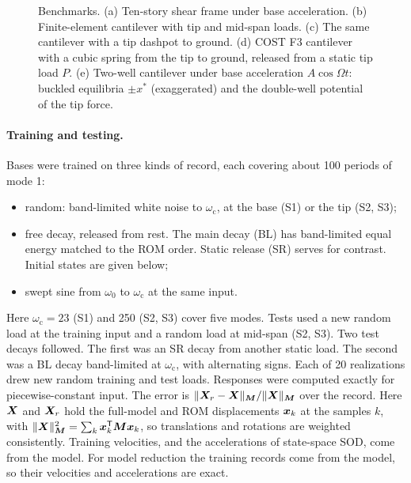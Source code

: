 \documentclass[preprint,12pt]{elsarticle}
\begin{document}
\begin{figure}[tbp]
\centering

\caption{Benchmarks. (a) Ten-story shear frame under base acceleration. (b) Finite-element cantilever with tip and mid-span loads. (c) The same cantilever with a tip dashpot to ground. (d) COST F3 cantilever with a cubic spring from the tip to ground, released from a static tip load $P$. (e) Two-well cantilever under base acceleration $A\cos\varOmega t$: buckled equilibria $\pm x^*$ (exaggerated) and the double-well potential of the tip force.}
\label{fig:systems}
\end{figure}

\paragraph{Training and testing.} Bases were trained on three kinds of record, each covering about 100 periods of mode 1:
\begin{itemize}
\item random: band-limited white noise to $\omega_{\mathrm c}$, at the base (S1) or the tip (S2, S3);
\item free decay, released from rest. The main decay (BL) has band-limited equal energy matched to the ROM order. Static release (SR) serves for contrast. Initial states are given below;
\item swept sine from $\omega_0$ to $\omega_{\mathrm c}$ at the same input.
\end{itemize}
Here $\omega_{\mathrm c}=23$ (S1) and 250 (S2, S3) cover five modes.
Tests used a new random load at the training input and a random load at mid-span (S2, S3). Two test decays followed. The first was an SR decay from another static load. The second was a BL decay band-limited at $\omega_{\mathrm c}$, with alternating signs.
Each of 20 realizations drew new random training and test loads.
Responses were computed exactly for piecewise-constant input.
The error is $\|\bm{X}_r-\bm{X}\|_{\bm{M}}/\|\bm{X}\|_{\bm{M}}$ over the record. Here $\bm{X}$ and $\bm{X}_r$ hold the full-model and ROM displacements $\bm{x}_k$ at the samples $k$, with $\|\bm{X}\|_{\bm{M}}^2=\sum_k\bm{x}_k^{\mathsf T}\bm{M}\bm{x}_k$, so translations and rotations are weighted consistently.
Training velocities, and the accelerations of state-space SOD, come from the model. For model reduction the training records come from the model, so their velocities and accelerations are exact.
\end{document}
